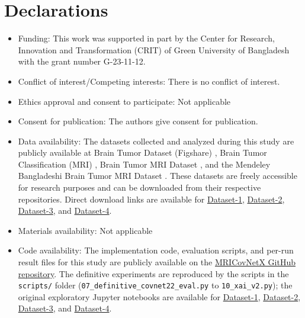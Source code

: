 \documentclass[a4paper,fleqn]{cas-sc}
\begin{document}
%

\clearpage
\FloatBarrier
\section*{Declarations}

\begin{itemize}
\item Funding:
This work was supported in part by the Center for Research, Innovation and Transformation (CRIT) of Green University of Bangladesh with the grant number G-23-11-12.
\item Conflict of interest/Competing interests: 
There is no conflict of interest.
\item Ethics approval and consent to participate:
Not applicable
\item Consent for publication:
The authors give consent for publication.
\item Data availability:
The datasets collected and analyzed during this study are publicly available at Brain Tumor Dataset (Figshare) \cite{R38}, Brain Tumor Classification (MRI) \cite{R39}, Brain Tumor MRI Dataset \cite{R40}, and the Mendeley Bangladeshi Brain Tumor MRI Dataset \cite{R58}. These datasets are freely accessible for research purposes and can be downloaded from their respective repositories. Direct download links are available for \href{https://drive.google.com/uc?id=1nt6PoC3EUD1F4Ct9xYa7fEs86aM58LHW}{Dataset-1}, \href{https://drive.usercontent.google.com/download?id=1WHlR-2MmlU-ZYiDaRPMbt7s9toO-8YiP&authuser=0}{Dataset-2}, \href{https://drive.google.com/uc?id=1fCwo_GO9M87tGP3AoDVdph0QyreXuQIl}{Dataset-3}, and \href{https://data.mendeley.com/datasets/mk56jw9rns/1}{Dataset-4}.
\item Materials availability:
Not applicable
\item Code availability: 
The implementation code, evaluation scripts, and per-run result files for this study are publicly available on the \href{https://github.com/saqlainovi/MRICovNetX}{MRICovNetX GitHub repository}. The definitive experiments are reproduced by the scripts in the \texttt{scripts/} folder (\texttt{07\_definitive\_covnet22\_eval.py} to \texttt{10\_xai\_v2.py}); the original exploratory Jupyter notebooks are available for \href{https://github.com/saqlainovi/MRICovNetX/blob/main/notebooks/Copy_of_CovBi_GRU_(Dataset_1)_.ipynb}{Dataset-1}, \href{https://github.com/saqlainovi/MRICovNetX/blob/main/notebooks/Copy_of_CovNet_(Dataset_2).ipynb}{Dataset-2}, \href{https://github.com/saqlainovi/MRICovNetX/blob/main/notebooks/CovNet_(Datase_3)(with_xai).ipynb}{Dataset-3}, and \href{https://github.com/saqlainovi/MRICovNetX/blob/main/notebooks/Brain_Tumor(Dataset_4\%20with_xai).ipynb}{Dataset-4}.

\end{itemize}
\end{document}

